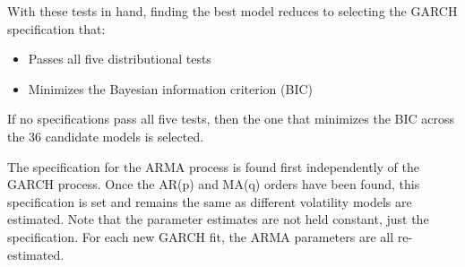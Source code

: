 \documentclass[12pt]{article}
\begin{document}
\begin{enumerate}
    With these tests in hand, finding the best model reduces to selecting the GARCH specification that:
    
    \begin{itemize}
        \item Passes all five distributional tests
        \item Minimizes the Bayesian information criterion (BIC)
    \end{itemize}

    If no specifications pass all five tests, then the one that minimizes the BIC across the 36 candidate models is selected.

\end{enumerate}

The specification for the ARMA process is found first independently of the GARCH process. Once the AR(p) and MA(q) orders have been found, this specification is set and remains the same as different volatility models are estimated. Note that the parameter estimates are not held constant, just the specification. For each new GARCH fit, the ARMA parameters are all re-estimated.

\printbibliography
\end{document}
